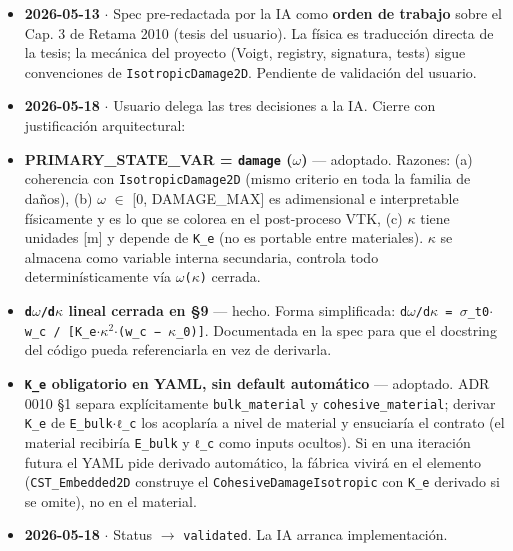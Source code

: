 \documentclass[11pt,letterpaper,oneside]{report}
\begin{document}
\begin{itemize}
  \item \textbf{2026-05-13} \ensuremath{\cdot} Spec pre-redactada por la IA como \textbf{orden de trabajo} sobre el Cap. 3 de Retama 2010 (tesis del usuario). La física es traducción directa de la tesis; la mecánica del proyecto (Voigt, registry, signatura, tests) sigue convenciones de \texttt{IsotropicDamage2D}. Pendiente de validación del usuario.
  \item \textbf{2026-05-18} \ensuremath{\cdot} Usuario delega las tres decisiones a la IA. Cierre con justificación arquitectural:
  \item \textbf{PRIMARY\_STATE\_VAR = \texttt{damage} (\ensuremath{\omega})} --- adoptado. Razones: (a) coherencia con \texttt{IsotropicDamage2D} (mismo criterio en toda la familia de daños), (b) \ensuremath{\omega} \ensuremath{\in} [0, DAMAGE\_MAX] es adimensional e interpretable físicamente y es lo que se colorea en el post-proceso VTK, (c) \ensuremath{\kappa} tiene unidades [m] y depende de \texttt{K\_e} (no es portable entre materiales). \ensuremath{\kappa} se almacena como variable interna secundaria, controla todo determinísticamente vía \texttt{\ensuremath{\omega}(\ensuremath{\kappa})} cerrada.
  \item \textbf{\texttt{d\ensuremath{\omega}/d\ensuremath{\kappa}} lineal cerrada en §9} --- hecho. Forma simplificada: \texttt{d\ensuremath{\omega}/d\ensuremath{\kappa} = \ensuremath{\sigma}\_t0\ensuremath{\cdot}w\_c / [K\_e\ensuremath{\cdot}\ensuremath{\kappa}\ensuremath{^{2}}\ensuremath{\cdot}(w\_c − \ensuremath{\kappa}\_0)]}. Documentada en la spec para que el docstring del código pueda referenciarla en vez de derivarla.
  \item \textbf{\texttt{K\_e} obligatorio en YAML, sin default automático} --- adoptado. ADR 0010 §1 separa explícitamente \texttt{bulk\_material} y \texttt{cohesive\_material}; derivar \texttt{K\_e} de \texttt{E\_bulk\ensuremath{\cdot}ℓ\_c} los acoplaría a nivel de material y ensuciaría el contrato (el material recibiría \texttt{E\_bulk} y \texttt{ℓ\_c} como inputs ocultos). Si en una iteración futura el YAML pide derivado automático, la fábrica vivirá en el elemento (\texttt{CST\_Embedded2D} construye el \texttt{CohesiveDamageIsotropic} con \texttt{K\_e} derivado si se omite), no en el material.
  \item \textbf{2026-05-18} \ensuremath{\cdot} Status \ensuremath{\to} \texttt{validated}. La IA arranca implementación.

\end{itemize}
\end{document}

